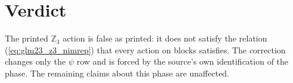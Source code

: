 \documentclass{article}
\begin{document}
\section{Verdict}
The printed $\mathbb Z_3$ action is false as printed: it does not satisfy the
relation (\ref{eq:glm23_z3_nimrep}) that every action on blocks satisfies.
The correction changes only the $\psi$ row and is forced by the source's own
identification of the phase. The remaining claims about this phase are
unaffected.


\end{document}
